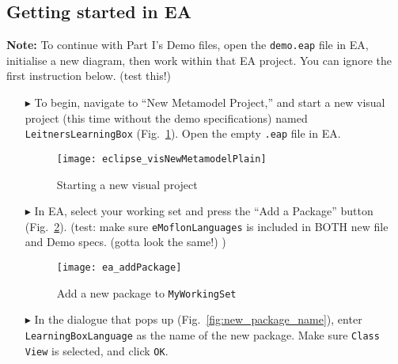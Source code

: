 \newpage
\subsection{Getting started in EA}
\visHeader
\hypertarget{static:starting vis}{}
  
{\bf Note:} To continue with Part I's Demo files, open the \texttt{demo.eap} file in EA, initialise a new diagram, then work within that EA project. You can
ignore the first instruction below. (test this!)

\begin{itemize}

\item[$\blacktriangleright$]  To begin, navigate to ``New Metamodel Project,'' and start a new visual project (this time without the demo specifications)
named \texttt{Leit\-ners\-Learn\-ing\-Box} (Fig.~\ref{fig:new_visModel}). Open the empty \texttt{.eap} file in EA.

\vspace{0.5cm}

\begin{figure}[htbp]
	\centering
  \texttt{[image: eclipse\_visNewMetamodelPlain]}
	\caption{Starting a new visual project}
	\label{fig:new_visModel}
\end{figure}

\vspace{0.5cm}

\item[$\blacktriangleright$] In EA, select your working set and press the ``Add a Package'' button (Fig.~\ref{fig:new_package}). (test: make sure
\texttt{eMoflonLanguages} is included in BOTH new file and Demo specs. (gotta look the same!) )

\begin{figure}[htbp]
	\centering
  \texttt{[image: ea\_addPackage]}
	\caption{Add a new package to \texttt{MyWorkingSet}}
	\label{fig:new_package}
	\vspace{0.5cm}
\end{figure}

\clearpage

\item[$\blacktriangleright$] In the dialogue that pops up (Fig.~\ref{fig:new_package_name}), enter \texttt{LearningBoxLanguage} as the name of the new
package. Make sure \texttt{Class View} is selected, and click \texttt{OK}.

\vspace{0.5cm}


\end{itemize}
